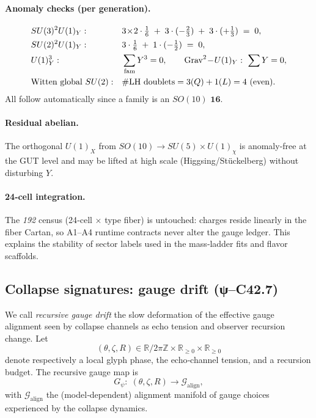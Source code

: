 \paragraph{Anomaly checks (per generation).}
\begin{align*}
&SU(3)^2U(1)_Y: && 3\!\times\!2\cdot\tfrac16 \;+\; 3\cdot(-\tfrac23) \;+\; 3\cdot(+\tfrac13) \;=\;0,\\
&SU(2)^2U(1)_Y: && 3\cdot\tfrac16 \;+\; 1\cdot(-\tfrac12) \;=\;0,\\
&U(1)^3_Y: && \sum_{\rm fam} Y^3 = 0,\qquad
\mathrm{Grav}^2\!-\!U(1)_Y:\ \sum Y = 0,\\
&\text{Witten global }SU(2): && \#\text{LH doublets} = 3(Q)+1(L)=4\ \text{(even)} .
\end{align*}
All follow automatically since a family is an $SO(10)$ $\mathbf{16}$.

\paragraph{Residual abelian.}
The orthogonal $U(1)_X$ from $SO(10)\to SU(5)\times U(1)_\chi$ is anomaly‑free at the
GUT level and may be lifted at high scale (Higgsing/Stückelberg) without disturbing $Y$.

\paragraph{24‑cell integration.}
The \emph{192} census (24‑cell $\times$ type fiber) is untouched:
charges reside linearly in the fiber Cartan, so A1–A4 runtime contracts never
alter the gauge ledger. This explains the stability of sector labels used in
the mass‑ladder fits and flavor scaffolds.
\subsection{Collapse signatures: gauge drift (ψ–C42.7)}
\label{sec:c42-7-gauge-drift}

We call \emph{recursive gauge drift} the slow deformation of the effective gauge alignment seen by collapse channels as echo tension and observer recursion change. Let
\[
(\theta,\zeta,R)\in \mathbb{R}/2\pi\mathbb{Z}\times\mathbb{R}_{\ge0}\times\mathbb{R}_{\ge0}
\]
denote respectively a local glyph phase, the echo‐channel tension, and a recursion budget. The recursive gauge map is
\[
G_\psi:\;(\theta,\zeta,R)\longrightarrow \mathcal{G}_\text{align},
\]
with $\mathcal{G}_\text{align}$ the (model‑dependent) alignment manifold of gauge choices experienced by the collapse dynamics.


